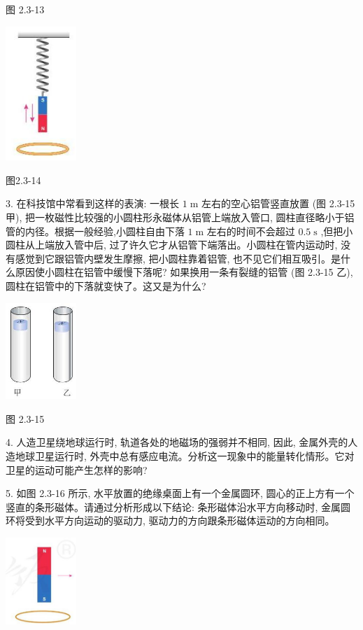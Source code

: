 \documentclass[10pt]{article}
\begin{document}
图 2.3-13

\begin{center}
\includegraphics[max width=0.2\textwidth]{images/01910e72-c5b7-7ed5-a6d4-fb3a5faefc32_44_773825.jpg}
\end{center}

图2.3-14

3. 在科技馆中常看到这样的表演: 一根长 \(1\mathrm{\;m}\) 左右的空心铝管竖直放置 (图 2.3-15 甲), 把一枚磁性比较强的小圆柱形永磁体从铝管上端放入管口, 圆柱直径略小于铝管的内径。根据一般经验,小圆柱自由下落 \(1\mathrm{\;m}\) 左右的时间不会超过 \({0.5}\mathrm{\;s}\) ,但把小圆柱从上端放入管中后, 过了许久它才从铝管下端落出。小圆柱在管内运动时, 没有感觉到它跟铝管内壁发生摩擦, 把小圆柱靠着铝管, 也不见它们相互吸引。是什么原因使小圆柱在铝管中缓慢下落呢? 如果换用一条有裂缝的铝管 (图 2.3-15 乙), 圆柱在铝管中的下落就变快了。这又是为什么?

\begin{center}
\includegraphics[max width=0.2\textwidth]{images/01910e72-c5b7-7ed5-a6d4-fb3a5faefc32_44_270743.jpg}
\end{center}

图 2.3-15

4. 人造卫星绕地球运行时, 轨道各处的地磁场的强弱并不相同, 因此, 金属外壳的人造地球卫星运行时, 外壳中总有感应电流。分析这一现象中的能量转化情形。它对卫星的运动可能产生怎样的影响?

5. 如图 2.3-16 所示, 水平放置的绝缘桌面上有一个金属圆环, 圆心的正上方有一个竖直的条形磁体。请通过分析形成以下结论: 条形磁体沿水平方向移动时, 金属圆环将受到水平方向运动的驱动力, 驱动力的方向跟条形磁体运动的方向相同。

\begin{center}
\includegraphics[max width=0.2\textwidth]{images/01910e72-c5b7-7ed5-a6d4-fb3a5faefc32_44_388143.jpg}
\end{center}
\end{document}
